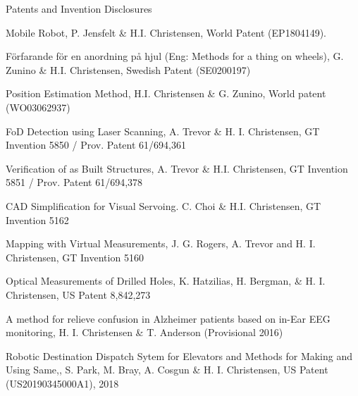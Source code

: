 \documentclass{article}
\begin{document}
\begin{cv}
	\begin{cvlist}{Patents and Invention Disclosures}
		\item Mobile Robot, P. Jensfelt \& H.I. Christensen, World Patent (EP1804149).
		\item F{\"o}rfarande f{\"o}r en anordning p{\aa} hjul (Eng: Methods for a thing
    on wheels), G. Zunino \& H.I. Christensen, Swedish Patent (SE0200197)
		\item Position Estimation Method, H.I. Christensen \& G. Zunino, World patent
    (WO03062937)
		\item FoD Detection using Laser Scanning, A. Trevor \& H. I. Christensen, GT
    Invention 5850 / Prov. Patent 61/694,361
		\item Verification of as Built Structures, A. Trevor \& H.I. Christensen, GT
    Invention 5851 / Prov. Patent 61/694,378
		\item CAD Simplification for Visual Servoing. C. Choi \& H.I. Christensen, GT
    Invention 5162
		\item Mapping with Virtual Measurements, J. G. Rogers, A. Trevor and H. I.
    Christensen, GT Invention 5160
		\item Optical Measurements of Drilled Holes, K. Hatzilias, H. Bergman, \& H. I.
    Christensen, US Patent 8,842,273
		\item A method for relieve confusion in Alzheimer patients based on in-Ear EEG
    monitoring, H. I. Christensen \& T. Anderson (Provisional 2016)
		\item Robotic Destination Dispatch Sytem for Elevators and Methods for Making
    and Using Same,, S. Park, M. Bray, A. Cosgun \& H. I. Christensen, US Patent
    (US20190345000A1), 2018
	\end{cvlist}




\end{cv}
\end{document}
